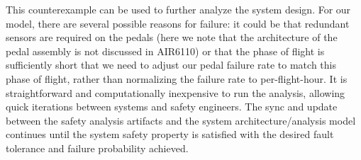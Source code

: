 This counterexample can be used to further analyze the system design.  For our model, there are several possible reasons for failure: it could be that redundant sensors are required on the pedals (here we note that the architecture of the pedal assembly is not discussed in AIR6110) or that the phase of flight is sufficiently short that we need to adjust our pedal failure rate to match this phase of flight, rather than normalizing the failure rate to per-flight-hour.  It is straightforward and computationally inexpensive to run the analysis, allowing quick iterations between systems and safety engineers. 
The sync and update between the safety analysis artifacts and the system architecture/analysis model continues until the system safety property is satisfied with the desired fault tolerance and failure probability achieved.